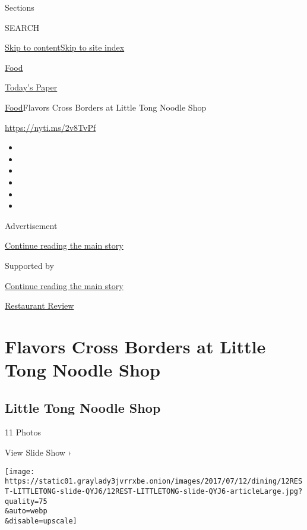 Sections

SEARCH

\protect\hyperlink{site-content}{Skip to
content}\protect\hyperlink{site-index}{Skip to site index}

\href{https://www.nytimes3xbfgragh.onion/section/food}{Food}

\href{https://myaccount.nytimes3xbfgragh.onion/auth/login?response_type=cookie\&client_id=vi}{}

\href{https://www.nytimes3xbfgragh.onion/section/todayspaper}{Today's
Paper}

\href{/section/food}{Food}\textbar{}Flavors Cross Borders at Little Tong
Noodle Shop

\url{https://nyti.ms/2v8TvPf}

\begin{itemize}
\item
\item
\item
\item
\item
\item
\end{itemize}

Advertisement

\protect\hyperlink{after-top}{Continue reading the main story}

Supported by

\protect\hyperlink{after-sponsor}{Continue reading the main story}

\href{/column/restaurant-review}{Restaurant Review}

\hypertarget{flavors-cross-borders-at-little-tong-noodle-shop}{%
\section{Flavors Cross Borders at Little Tong Noodle
Shop}\label{flavors-cross-borders-at-little-tong-noodle-shop}}

\href{https://www.nytimes3xbfgragh.onion/slideshow/2017/07/11/dining/little-tong-noodle-shop-nyc.html}{}

\hypertarget{little-tong-noodle-shop}{%
\subsection{Little Tong Noodle Shop}\label{little-tong-noodle-shop}}

11 Photos

View Slide Show ›

\texttt{[image: https://static01.graylady3jvrrxbe.onion/images/2017/07/12/dining/12REST-LITTLETONG-slide-QYJ6/12REST-LITTLETONG-slide-QYJ6-articleLarge.jpg?quality=75\\\&auto=webp\\\&disable=upscale]}

